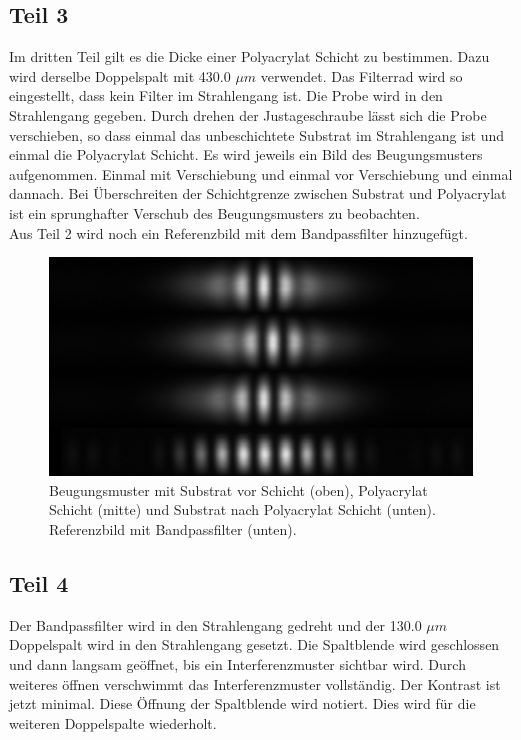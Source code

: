 \documentclass[12pt,a4paper,twoside]{article}
\begin{document}
\subsection{Teil 3}
Im dritten Teil gilt es die Dicke einer Polyacrylat Schicht zu bestimmen. Dazu wird derselbe Doppelspalt mit 430.0 $\mu m$ verwendet. Das Filterrad wird so eingestellt, dass kein Filter im Strahlengang ist. 
Die Probe wird in den Strahlengang gegeben. Durch drehen der Justageschraube lässt sich die Probe verschieben, so dass einmal das unbeschichtete Substrat im Strahlengang ist und einmal die Polyacrylat Schicht. 
Es wird jeweils ein Bild des Beugungsmusters aufgenommen. Einmal mit Verschiebung und einmal vor Verschiebung und einmal dannach. Bei Überschreiten der Schichtgrenze zwischen Substrat und Polyacrylat ist ein sprunghafter Verschub des Beugungsmusters zu beobachten. 
\\
Aus Teil 2 wird noch ein Referenzbild mit dem Bandpassfilter hinzugefügt. 

\begin{figure}[H]
    \centering
    \includegraphics[width=0.7\linewidth]{nudes/aufgabe 3 neu.jpg}
    \caption{Beugungsmuster mit Substrat vor Schicht (oben), Polyacrylat Schicht (mitte) und Substrat nach Polyacrylat Schicht (unten). Referenzbild mit Bandpassfilter (unten). }
    \label{fig:aufgabe 3}
\end{figure}

\subsection{Teil 4}
Der Bandpassfilter wird in den Strahlengang gedreht und der 130.0 $\mu m$ Doppelspalt wird in den Strahlengang gesetzt. Die Spaltblende wird geschlossen und dann langsam geöffnet, bis ein Interferenzmuster sichtbar wird. 
Durch weiteres öffnen verschwimmt das Interferenzmuster vollständig. Der Kontrast ist jetzt minimal. Diese Öffnung der Spaltblende wird notiert. 
Dies wird für die weiteren Doppelspalte wiederholt.  
\end{document}
